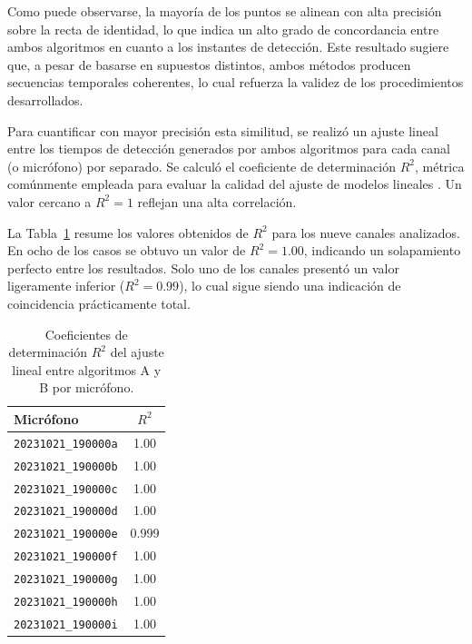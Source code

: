 Como puede observarse, la mayoría de los puntos se alinean con 
alta precisión sobre la recta de identidad, lo que indica un 
alto grado de concordancia entre ambos algoritmos en cuanto a 
los instantes de detección. Este resultado sugiere que, a pesar 
de basarse en supuestos distintos, ambos métodos producen 
secuencias temporales coherentes, lo cual refuerza la validez 
de los procedimientos desarrollados.

Para cuantificar con mayor precisión esta similitud, se realizó 
un ajuste lineal entre los tiempos de detección generados por 
ambos algoritmos para cada canal (o micrófono) por separado. Se 
calculó el coeficiente de determinación \( R^2 \), métrica 
comúnmente empleada para evaluar la calidad del ajuste de 
modelos lineales \cite{nagelkerke1991note}. Un valor cercano a 
\( R^2 = 1 \) reflejan una alta correlación.

La Tabla~\ref{tab:r2_results} resume los valores obtenidos de 
\( R^2 \) para los nueve canales analizados. En ocho de los 
casos se obtuvo un valor de \( R^2 = 1.00 \), indicando un 
solapamiento perfecto entre los resultados. Solo uno de los 
canales presentó un valor ligeramente inferior (\( R^2 = 0.99 \)), 
lo cual sigue siendo una indicación de coincidencia 
prácticamente total.

\begin{table}[ht]
    \centering
    \caption{Coeficientes de determinación \( R^2 \) del ajuste lineal entre algoritmos A y B por micrófono.}
    \label{tab:r2_results}
    \begin{tabular}{lc}
        \toprule
        \textbf{Micrófono} & \textbf{\( R^2 \)} \\
        \midrule
        \texttt{20231021\_190000a} & 1.00 \\
        \texttt{20231021\_190000b} & 1.00 \\
        \texttt{20231021\_190000c} & 1.00 \\
        \texttt{20231021\_190000d} & 1.00 \\
        \texttt{20231021\_190000e} & 0.999 \\
        \texttt{20231021\_190000f} & 1.00 \\
        \texttt{20231021\_190000g} & 1.00 \\
        \texttt{20231021\_190000h} & 1.00 \\
        \texttt{20231021\_190000i} & 1.00 \\
        \bottomrule
    \end{tabular}
\end{table}

